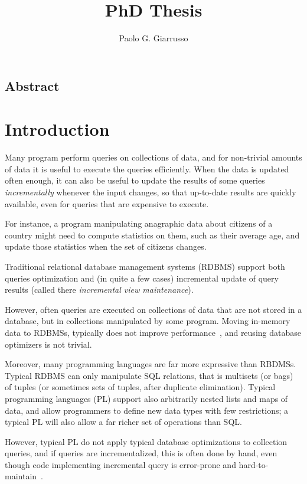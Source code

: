 \documentclass{book}
\title{PhD Thesis}
\author{Paolo G. Giarrusso}
\begin{document}
\maketitle
\section*{Abstract}

\chapter{Introduction}

Many program perform queries on collections of data, and for non-trivial amounts
of data it is useful to execute the queries efficiently. When the data is
updated often enough, it can also be useful to update the results of some
queries \emph{incrementally} whenever the input changes, so that up-to-date
results are quickly available, even for queries that are expensive to execute.

For instance, a program manipulating anagraphic data about citizens of a country
might need to compute statistics on them, such as their average age, and update
those statistics when the set of citizens changes.

Traditional relational database management systems (RDBMS) support both queries
optimization and (in quite a few cases) incremental update of query results
(called there \emph{incremental view maintenance}).

However, often queries are executed on collections of data that are not stored
in a database, but in collections manipulated by some program. Moving in-memory
data to RDBMSs, typically does not improve
performance~\citep{Stonebraker07,Rompf2015functional}, and reusing database
optimizers is not trivial.

Moreover, many programming languages are far more expressive than RBDMSs.
Typical RDBMS can only manipulate SQL relations, that is multisets (or bags) of
tuples (or sometimes sets of tuples, after duplicate elimination). Typical
programming languages (PL) support also arbitrarily nested lists and maps of
data, and allow programmers to define new data types with few restrictions; a
typical PL will also allow a far richer set of operations than SQL.

However, typical PL do not apply typical database optimizations to collection
queries, and if queries are incrementalized, this is often done by hand, even
though code implementing incremental query is error-prone and
hard-to-maintain~\citep{Salvaneschi13reactive}.
\end{document}
